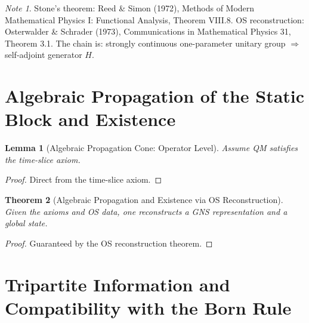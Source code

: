 \documentclass[11pt]{article}
\newtheorem{theorem}{Theorem}[section]
\newtheorem{lemma}[theorem]{Lemma}
\theoremstyle{definition}
\theoremstyle{remark}
\newtheorem*{note}{Note}
\begin{document}
\begin{note}
Stone's theorem: Reed \& Simon (1972), Methods of Modern Mathematical Physics I: Functional Analysis, Theorem VIII.8. OS reconstruction: Osterwalder \& Schrader (1973), Communications in Mathematical Physics 31, Theorem 3.1. The chain is: strongly continuous one-parameter unitary group \( \Rightarrow \) self-adjoint generator \( H \).
\end{note}

\section{Algebraic Propagation of the Static Block and Existence}\label{sec:propagation}

\begin{lemma}[Algebraic Propagation Cone: Operator Level]\label{lem:propagation}
Assume QM satisfies the time-slice axiom.
\end{lemma}

\begin{proof}
Direct from the time-slice axiom.
\end{proof}

\begin{theorem}[Algebraic Propagation and Existence via OS Reconstruction]\label{thm:existence}
Given the axioms and OS data, one reconstructs a GNS representation and a global state.
\end{theorem}

\begin{proof}
Guaranteed by the OS reconstruction theorem.
\end{proof}

\section{Tripartite Information and Compatibility with the Born Rule}\label{sec:tripartite}
\end{document}
